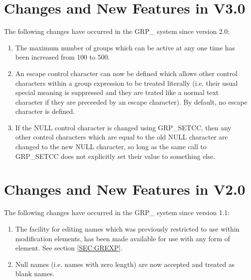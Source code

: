 \section{Changes and New Features in V3.0}
The following changes have occurred in the GRP\_ system since version 2.0:

\begin{enumerate}

\item The maximum number of groups which can be active at any one time
has been increased from 100 to 500.

\item An escape control character can now be defined which allows other
control characters within a group expression to be treated literally
(i.e. their usual special meaning is suppressed and they are trated like a
normal text character if they are preceeded by an escape character). By
default, no escape character is defined.

\item If the NULL control character is changed using GRP\_SETCC, then any
other control characters which are equal to the old NULL character are
changed to the new NULL character, so long as the same call to GRP\_SETCC
does not explicitly set their value to something else.

\end{enumerate}

\section{Changes and New Features in V2.0}
The following changes have occurred in the GRP\_ system since version 1.1:
\begin{enumerate}
\item The facility for editing names which was previously restricted to use
within modification elements, has been made available for use with any form
of element. See section \ref{SEC:GREXP}.
\item Null names (i.e. names with zero length) are now accepted and treated as
blank names.
\end{enumerate}


